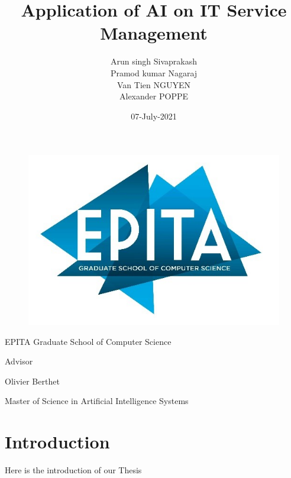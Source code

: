 \documentclass[12pt]{article}
\author{}
\date{}
\begin{document}
    \title{\textbf{Application of AI on IT Service Management}}
    \maketitle
    \thispagestyle{empty}

    \begin{figure}[h]
        \includegraphics[scale=1.0]{EPITA.jpg}
        \centering
    \end{figure}
    
    \author{
        \begin{center}
            \centerline{Arun singh Sivaprakash}
            \centerline{Pramod kumar Nagaraj}
            \centerline{Van Tien NGUYEN}
            \centerline{Alexander POPPE}
        \end{center}
    }

    \centerline{EPITA Graduate School of Computer Science}
    
    \begin{center}
        \centerline{Advisor}
        \centerline{ Olivier Berthet}
    \end{center}

    \begin{center}
        Master of Science in Artificial Intelligence Systems
    \end{center}

    \begin{center}
        \date{07-July-2021}
    \end{center}

    \newpage
    \setcounter{page}{1}

    \section*{Introduction}
    Here is the introduction of our Thesis
\end{document}

